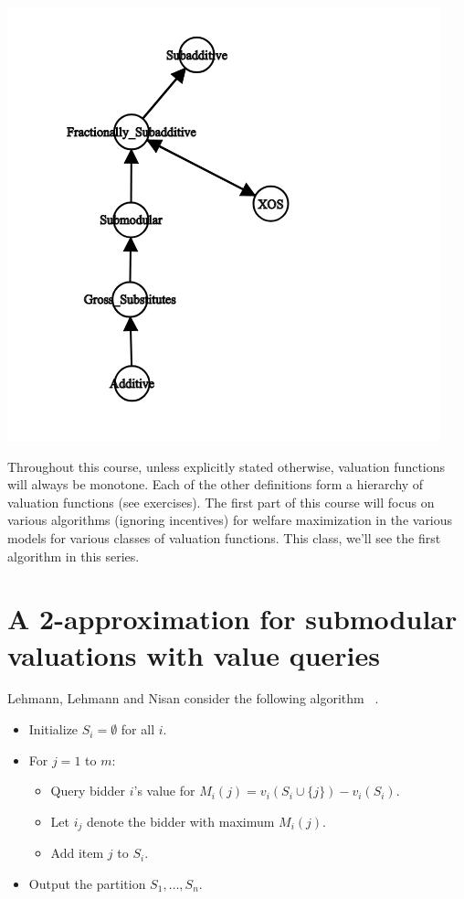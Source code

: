 \documentclass[12pt]{article}%
\begin{document}
\begin{center}
\includegraphics[scale=.8]{graph.png}
\end{center}
Throughout this course, unless explicitly stated otherwise, valuation functions will always be monotone. Each of the other definitions form a hierarchy of valuation functions (see exercises). The first part of this course will focus on various algorithms (ignoring incentives) for welfare maximization in the various models for various classes of valuation functions. This class, we'll see the first algorithm in this series.

\section{A 2-approximation for submodular valuations with value queries}
Lehmann, Lehmann and Nisan consider the following algorithm ~\cite{LehmannLN01}. 
\begin{itemize}
\item Initialize $S_i = \emptyset$ for all $i$.
\item For $j = 1$ to $m$:
\begin{itemize}
\item Query bidder $i$'s value for $M_i(j)= v_i(S_i \cup \{j\})-v_i(S_i)$. 
\item Let $i_j$ denote the bidder with maximum $M_i(j)$.
\item Add item $j$ to $S_i$.
\end{itemize}
\item Output the partition $S_1,\ldots, S_n$.
\end{itemize}
\end{document}
